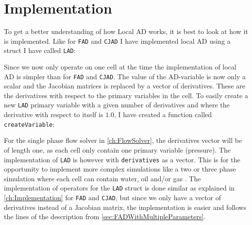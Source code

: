 \section{Implementation}
To get a better understanding of how Local AD works, it is best to look at how it is implemented. Like for \texttt{FAD} and \texttt{CJAD} I have implemented local AD using a struct I have called \texttt{LAD}:

Since we now only operate on one cell at the time the implementation of local AD is simpler than for \texttt{FAD} and \texttt{CJAD}. The value of the AD-variable is now only a scalar and the Jacobian matrices is replaced by a vector of derivatives. These are the derivatives  with respect to the primary variables in the cell. To easily create a new \texttt{LAD} primary variable with a given number of derivatives and where the derivative with respect to itself is $1.0$, I have created a function called \texttt{createVariable}:

For the single phase flow solver in \autoref{ch:FlowSolver}, the derivatives vector will be of length one, as each cell only contain one primary variable (pressure). The implementation of \texttt{LAD} is however with \texttt{derivatives} as a vector. This is for the opportunity to implement more complex simulations like a two or three phase simulation where each cell can contain water, oil and/or gas . The implementation of operators for the \texttt{LAD} struct is done similar as explained in \autoref{ch:Implementation} for \texttt{FAD} and \texttt{CJAD}, but since we only have a vector of derivatives instead of a Jacobian matrix, the implementation is easier and follows the lines of the description from \autoref{sec:FADWithMultipleParameters}. 

